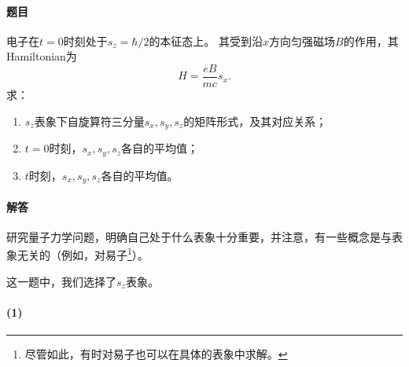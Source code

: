 \begin{tcolorbox}[breakable, title={\textbf{自旋}}]
    \paragraph{题目}
    电子在$t=0$时刻处于$s_z=\hbar/2$的本征态上。
    其受到沿$x$方向匀强磁场$B$的作用，其Hamiltonian为
    \begin{equation}
        H = \frac{eB}{mc} s_x.
    \end{equation}
    求：
    \begin{enumerate}
        \item $s_z$表象下自旋算符三分量$s_x,s_y,s_z$的矩阵形式，及其对应关系；
        \item $t=0$时刻，$s_x,s_y,s_z$各自的平均值；
        \item $t$时刻，$s_x,s_y,s_z$各自的平均值。
    \end{enumerate}

    \paragraph{解答}

    研究量子力学问题，明确自己处于什么表象十分重要，并注意，有一些概念是与表象无关的（例如，对易子\footnote{尽管如此，有时对易子也可以在具体的表象中求解。}）。

    这一题中，我们选择了$s_z$表象。

    \paragraph{(1)}


\end{tcolorbox}
